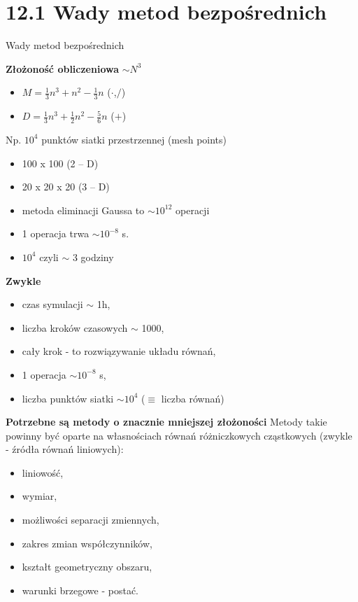 \section{12.1 Wady metod bezpośrednich}

\begin{frame}{Wady metod bezpośrednich}
  \begin{block}{\textbf{Złożoność obliczeniowa} ${\sim}N^3$}
    \begin{itemize}
      \item{ $M=\frac{1}{3}n^3+n^2-\frac{1}{3}n$ ($\cdot$,$/$)}
      \item{ $D=\frac{1}{3}n^3+\frac{1}{2}n^2-\frac{5}{6}n$ ($+$)}
    \end{itemize}
    Np. $10^4$ punktów siatki przestrzennej (mesh points)
    \begin{itemize}
      \item{100 x 100   (2 -- D)}
      \item{20 x 20 x 20   (3 -- D)}
      \item{metoda eliminacji Gaussa to $\sim 10^{12}$ operacji}
      \item{1 operacja trwa $\sim 10^{-8}$ s.}
      \item{$10^4$ czyli $\sim$ 3 godziny}
    \end{itemize}
  \end{block}
\end{frame}

\begin{frame}{}
  \begin{block}{\textbf{Zwykle}}
    \begin{itemize}
      \item{czas symulacji $\sim$ 1h,}
      \item{liczba kroków czasowych $\sim$ 1000,}
      \item{cały krok - to rozwiązywanie układu równań,}
      \item{1 operacja $\sim 10^{-8}$ s,}
      \item{liczba punktów siatki $\sim 10^4$ ($\equiv$ liczba równań)}
    \end{itemize}
  \end{block}
\end{frame}

\begin{frame}{}
  \begin{block}{\textbf{Potrzebne są metody o znacznie mniejszej złożoności}}
    Metody takie powinny być oparte na własnościach równań różniczkowych cząstkowych (zwykle - źródła równań liniowych):
    \begin{itemize}
      \item{liniowość,}
      \item{wymiar,}
      \item{możliwości separacji zmiennych,}
      \item{zakres zmian współczynników,}
      \item{kształt geometryczny obszaru,}
      \item{warunki brzegowe - postać.}
    \end{itemize}
  \end{block}
\end{frame}

